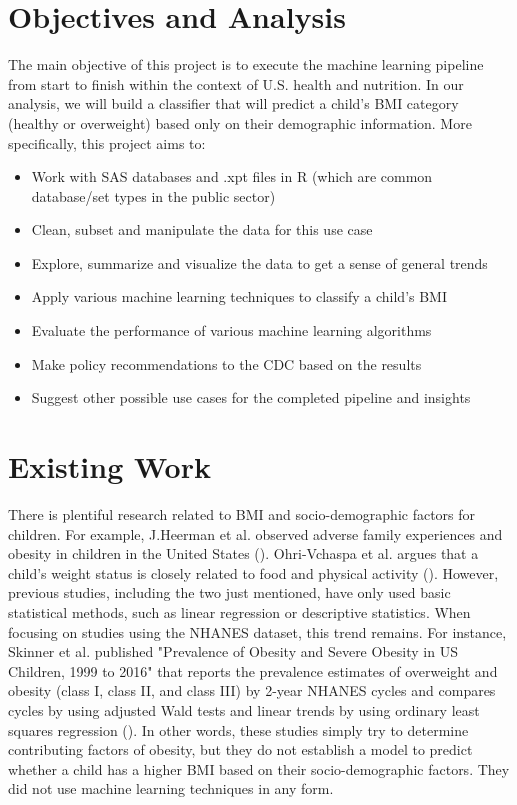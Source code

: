 \documentclass[twoside,11pt]{article}
\begin{document}
\section{Objectives and Analysis}
The main objective of this project is to execute the machine learning pipeline from start to finish within the context of U.S. health and nutrition. In our analysis, we will build a classifier that will predict a child's BMI category (healthy or overweight) based only on their demographic information. More specifically, this project aims to:
\begin{itemize}[noitemsep,topsep=0pt]
\item Work with SAS databases and .xpt files in R (which are common database/set types in the public sector)
\item Clean, subset and manipulate the data for this use case
\item Explore, summarize and visualize the data to get a sense of general trends
\item Apply various machine learning techniques to classify a child's BMI
\item Evaluate the performance of various machine learning algorithms
\item Make policy recommendations to the CDC based on the results
\item Suggest other possible use cases for the completed pipeline and insights
\end{itemize}

\section{Existing Work}
There is plentiful research related to BMI and socio-demographic factors for children. For example, J.Heerman et al. observed adverse family experiences and obesity in children in the United States (\cite{heer:16}). Ohri-Vchaspa et al. argues that a child's weight status is closely related to food and physical activity (\cite{ohri:13}). However, previous studies, including the two just mentioned, have only used basic statistical methods, such as linear regression or descriptive statistics. When focusing on studies using the NHANES dataset, this trend remains. For instance, Skinner et al. published "Prevalence of Obesity and Severe Obesity in US Children, 1999 to 2016" that reports the prevalence estimates of overweight and obesity (class I, class II, and class III) by 2-year NHANES cycles and compares cycles by using adjusted Wald tests and linear trends by using ordinary least squares regression (\cite{cockrell:18}). In other words, these studies simply try to determine contributing factors of obesity, but they do not establish a model to predict whether a child has a higher BMI based on their socio-demographic factors. They did not use machine learning techniques in any form. 
\end{document}

